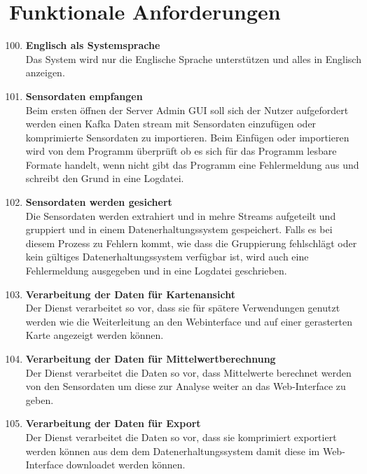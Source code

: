 \chapter{Funktionale Anforderungen}
\begin{enumerate}[label=\textbf{PF\arabic{enumi}0}]
	\setcounter{enumi}{99}
	
	\item \textbf{Englisch als Systemsprache}\\
		Das System wird nur die Englische Sprache unterstützen und alles in Englisch anzeigen. 
	
	\item \textbf{Sensordaten empfangen} \label{A1}\\
		Beim ersten öffnen der Server Admin GUI soll sich der Nutzer aufgefordert werden einen Kafka Daten stream mit Sensordaten einzufügen oder komprimierte Sensordaten zu importieren. Beim Einfügen oder importieren wird von dem Programm überprüft ob es sich für das Programm lesbare Formate handelt, wenn nicht gibt das Programm eine Fehlermeldung aus und schreibt den Grund in eine Logdatei.  
		
	\item \textbf{Sensordaten werden gesichert}\\
		Die Sensordaten werden extrahiert und in mehre Streams aufgeteilt und gruppiert und in einem Datenerhaltungssystem gespeichert. Falls es bei diesem Prozess zu Fehlern kommt, wie dass die Gruppierung fehlschlägt oder kein gültiges Datenerhaltungssystem verfügbar ist, wird auch eine Fehlermeldung ausgegeben und in eine Logdatei geschrieben.
		
	\item \textbf{Verarbeitung der Daten für Kartenansicht} \label{FAKarten}\\
		Der Dienst verarbeitet so vor, dass sie für spätere Verwendungen genutzt werden wie die Weiterleitung an den Webinterface und auf einer gerasterten Karte angezeigt werden können.
	
	\item \textbf{Verarbeitung der Daten für Mittelwertberechnung} \label{FAMittel}\\
		Der Dienst verarbeitet die Daten so vor, dass Mittelwerte berechnet werden von den Sensordaten um diese zur Analyse weiter an das Web-Interface zu geben.
	
	\item \textbf{Verarbeitung der Daten für Export}\\
		Der Dienst verarbeitet die Daten so vor, dass sie komprimiert exportiert werden können aus dem dem Datenerhaltungssystem damit diese im Web-Interface downloadet werden können.
	

\end{enumerate}
